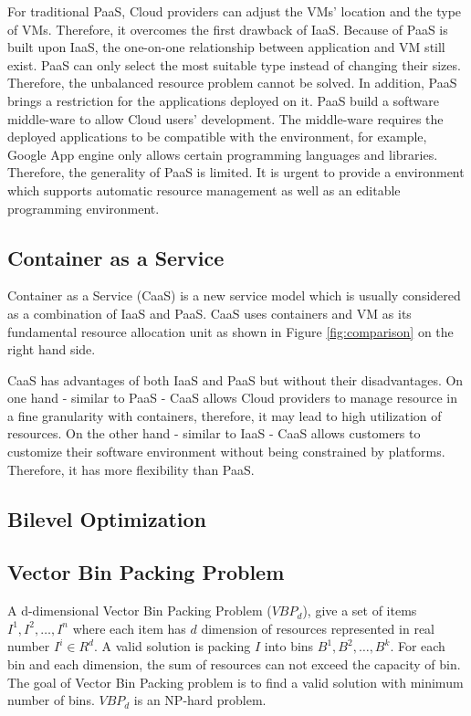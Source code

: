 For traditional PaaS, Cloud providers can adjust the VMs' location and the type of VMs. Therefore, it overcomes the first drawback of IaaS. Because of PaaS is built upon IaaS, the one-on-one relationship between application and VM still exist. PaaS can only select the most suitable type instead of changing their sizes. Therefore, the unbalanced resource problem cannot be solved. In addition, PaaS brings a restriction for the applications deployed on it. PaaS build a software middle-ware to allow Cloud users' development. The middle-ware requires the deployed applications to be compatible with the environment, for example, Google App engine only allows certain programming languages and libraries. Therefore, the generality of PaaS is limited. It is urgent to provide a environment which supports automatic resource management as well as an editable programming environment.


\subsection{Container as a Service}
Container as a Service (CaaS) \cite{Piraghaj:2017vi} is a new service model which is usually considered as a combination of IaaS and PaaS. CaaS uses containers and VM as its fundamental resource allocation unit as shown in Figure \ref{fig:comparison} on the right hand side. 


CaaS has advantages of both IaaS and PaaS  but without their disadvantages. On one hand - similar to PaaS - CaaS allows Cloud providers to manage resource in a fine granularity with containers, therefore, it may lead to high utilization of resources. On the other hand - similar to IaaS - CaaS allows customers to customize their software environment without being constrained by platforms. Therefore, it has more flexibility than PaaS.
	
\subsection{Bilevel Optimization}

\subsection{Vector Bin Packing Problem}

A d-dimensional Vector Bin Packing Problem ($VBP_d$), give a set of items $I^1, I^2, \dots, I^n$ where each item has $d$ dimension of resources represented in real number $I^i \in R^d$. A valid solution is packing $I$ into bins $B^1, B^2, \dots, B^k$. For each bin and each dimension, the sum of resources can not exceed the capacity of bin. The goal of Vector Bin Packing problem is to find a valid solution with minimum number of bins. $VBP_d$ is an NP-hard problem.

